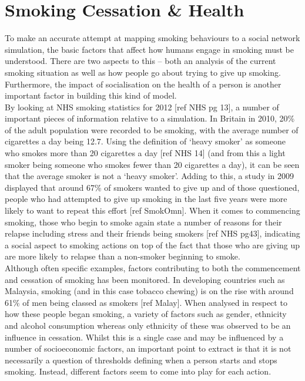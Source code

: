 \documentclass[]{report}
\begin{document}
\section{Smoking Cessation \& Health}
To make an accurate attempt at mapping smoking behaviours to a social network simulation, the basic factors that affect how humans engage in smoking must be understood. There are two aspects to this – both an analysis of the current smoking situation as well as how people go about trying to give up smoking. Furthermore, the impact of socialisation on the health of a person is another important factor in building this kind of model. \\
By looking at NHS smoking statistics for 2012 [ref NHS pg 13], a number of important pieces of information relative to a simulation. In Britain in 2010, 20\% of the adult population were recorded to be smoking, with the average number of cigarettes a day being 12.7. Using the definition of `heavy smoker' as someone who smokes more than 20 cigarettes a day [ref NHS 14] (and from this a light smoker being someone who smokes fewer than 20 cigarettes a day), it can be seen that the average smoker is not a `heavy smoker'. Adding to this, a study in 2009 displayed that around 67\% of smokers wanted to give up and of those questioned, people who had attempted to give up smoking in the last five years were more likely to want to repeat this effort [ref SmokOmn]. When it comes to commencing smoking, those who begin to smoke again state a number of reasons for their relapse including stress and their friends being smokers [ref NHS pg43], indicating a social aspect to smoking actions on top of the fact that those who are giving up are more likely to relapse than a non-smoker beginning to smoke.\\
Although often specific examples, factors contributing to both the commencement and cessation of smoking has been monitored. In developing countries such as Malaysia, smoking (and in this case tobacco chewing) is on the rise with around 61\% of men being classed as smokers [ref Malay]. When analysed in respect to how these people began smoking, a variety of factors such as gender, ethnicity and alcohol consumption whereas only ethnicity of these was observed to be an influence in cessation. Whilst this is a single case and may be influenced by a number of socioeconomic factors, an important point to extract is that it is not necessarily a question of thresholds defining when a person starts and stops smoking. Instead, different factors seem to come into play for each action.
\end{document}
